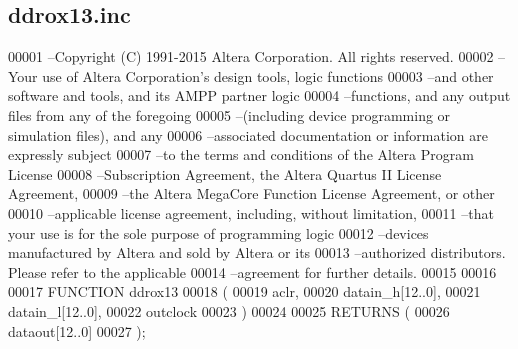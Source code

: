 \subsection{ddrox13.\+inc}
\label{ddrox13_8inc_source}

\begin{DoxyCode}
00001 --Copyright (C) 1991-2015 Altera Corporation. All rights reserved.
00002 --Your use of Altera Corporation\textcolor{stringliteral}{'s design tools, logic functions }
00003 \textcolor{stringliteral}{--and other software and tools, and its AMPP partner logic }
00004 \textcolor{stringliteral}{--functions, and any output files from any of the foregoing }
00005 \textcolor{stringliteral}{--(including device programming or simulation files), and any }
00006 \textcolor{stringliteral}{--associated documentation or information are expressly subject }
00007 \textcolor{stringliteral}{--to the terms and conditions of the Altera Program License }
00008 \textcolor{stringliteral}{--Subscription Agreement, the Altera Quartus II License Agreement,}
00009 \textcolor{stringliteral}{--the Altera MegaCore Function License Agreement, or other }
00010 \textcolor{stringliteral}{--applicable license agreement, including, without limitation, }
00011 \textcolor{stringliteral}{--that your use is for the sole purpose of programming logic }
00012 \textcolor{stringliteral}{--devices manufactured by Altera and sold by Altera or its }
00013 \textcolor{stringliteral}{--authorized distributors.  Please refer to the applicable }
00014 \textcolor{stringliteral}{--agreement for further details.}
00015 \textcolor{stringliteral}{}
00016 \textcolor{stringliteral}{}
00017 \textcolor{stringliteral}{FUNCTION ddrox13 }
00018 \textcolor{stringliteral}{(}
00019 \textcolor{stringliteral}{    aclr,}
00020 \textcolor{stringliteral}{    datain\_h[12..0],}
00021 \textcolor{stringliteral}{    datain\_l[12..0],}
00022 \textcolor{stringliteral}{    outclock}
00023 \textcolor{stringliteral}{)}
00024 \textcolor{stringliteral}{}
00025 \textcolor{stringliteral}{RETURNS (}
00026 \textcolor{stringliteral}{    dataout[12..0]}
00027 \textcolor{stringliteral}{);}
\end{DoxyCode}
